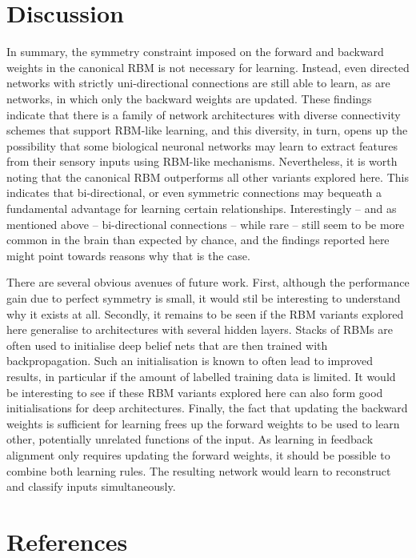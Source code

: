 \documentclass[11pt]{article}
\begin{document}
\section{Discussion}

In summary, the symmetry constraint imposed on the forward and
backward weights in the canonical RBM is not necessary for
learning. Instead, even directed networks with strictly
uni-directional connections are still able to learn, as are networks,
in which only the backward weights are updated. %
These findings indicate that there is a family of network
architectures with diverse connectivity schemes that support RBM-like
learning, and this diversity, in turn, opens up the possibility that
some biological neuronal networks may learn to extract features from
their sensory inputs using RBM-like mechanisms. %
Nevertheless, it is worth noting that the canonical RBM outperforms
all other variants explored here. This indicates that bi-directional,
or even symmetric connections may bequeath a fundamental advantage for
learning certain relationships. Interestingly -- and as mentioned
above -- bi-directional connections -- while rare -- still seem to be
more common in the brain than expected by chance, and the findings
reported here might point towards reasons why that is the case.

There are several obvious avenues of future work. %
First, although the performance gain due to perfect symmetry is small,
it would stil be interesting to understand why it exists at all. %
Secondly, it remains to be seen if the RBM variants explored here
generalise to architectures with several hidden layers. Stacks of RBMs
are often used to initialise deep belief nets that are then trained
with backpropagation. Such an initialisation is known to often lead to
improved results, in particular if the amount of labelled training
data is limited. It would be interesting to see if these RBM variants
explored here can also form good initialisations for deep
architectures. %
Finally, the fact that updating the backward weights is sufficient for
learning frees up the forward weights to be used to learn other,
potentially unrelated functions of the input. As learning in feedback
alignment only requires updating the forward weights, it should be
possible to combine both learning rules. The resulting network would
learn to reconstruct and classify inputs simultaneously.

\section{References}


\end{document}
